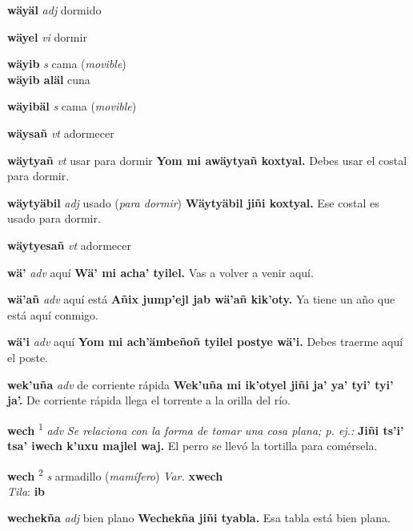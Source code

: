 \documentclass[10pt]{scrbook}
\newcommand{\entry}[1]{\textbf{#1}}
\newcommand{\defsuperscript}[1]{\textsuperscript{#1}}
\newcommand{\nontranslationdef}[1]{\textit{#1}}
\newcommand{\partofspeech}[1]{\textit{#1}}
\newcommand{\spanishtranslation}[1]{#1}
\newcommand{\clarification}[1]{(\textit{#1})}
\newcommand{\cholexample}[1]{\textbf{#1}}
\newcommand{\exampletranslation}[1]{#1}
\newcommand{\dialectvariant}[1]{\\\textit{#1}:}
\newcommand{\dialectword}[1]{\textbf{#1}}
\newcommand{\secondaryentry}[1]{\\\textbf{#1}}
\newcommand{\secondtranslation}[1]{#1}
\newcommand{\variation}[1]{\textit{Var.} \textbf{#1}}
\begin{document}
\begin{multicols}{2}
\entry{wäyäl}
\partofspeech{adj}
\spanishtranslation{dormido}

\entry{wäyel}
\partofspeech{vi}
\spanishtranslation{dormir}

\entry{wäyib}
\partofspeech{s}
\spanishtranslation{cama}
\clarification{movible}
\secondaryentry{wäyib aläl}
\secondtranslation{cuna}

\entry{wäyibäl}
\partofspeech{s}
\spanishtranslation{cama}
\clarification{movible}

\entry{wäysañ}
\partofspeech{vt}
\spanishtranslation{adormecer}

\entry{wäytyañ}
\partofspeech{vt}
\spanishtranslation{usar para dormir}
\cholexample{Yom mi awäytyañ koxtyal.}
\exampletranslation{Debes usar el costal para dormir.}

\entry{wäytyäbil}
\partofspeech{adj}
\spanishtranslation{usado}
\clarification{para dormir}
\cholexample{Wäytyäbil jiñi koxtyal.}
\exampletranslation{Ese costal es usado para dormir.}

\entry{wäytyesañ}
\partofspeech{vt}
\spanishtranslation{adormecer}

\entry{wä'}
\partofspeech{adv}
\spanishtranslation{aquí}
\cholexample{Wä' mi acha' tyilel.}
\exampletranslation{Vas a volver a venir aquí.}

\entry{wä'añ}
\partofspeech{adv}
\spanishtranslation{aquí está}
\cholexample{Añix jump'ejl jab wä'añ kik'oty.}
\exampletranslation{Ya tiene un año que está aquí conmigo.}

\entry{wä'i}
\partofspeech{adv}
\spanishtranslation{aquí}
\cholexample{Yom mi ach'ämbeñoñ tyilel postye wä'i.}
\exampletranslation{Debes traerme aquí el poste.}

\entry{wek'uña}
\partofspeech{adv}
\spanishtranslation{de corriente rápida}
\cholexample{Wek'uña mi ik'otyel jiñi ja' ya' tyi' tyi' ja'.}
\exampletranslation{De corriente rápida llega el torrente a la orilla del río.}

\entry{wech}
\defsuperscript{1}
\partofspeech{adv}
\nontranslationdef{Se relaciona con la forma de tomar una cosa plana; p. ej.:}
\cholexample{Jiñi ts'i' tsa' iwech k'uxu majlel waj.}
\exampletranslation{El perro se llevó la tortilla para comérsela.}

\entry{wech}
\defsuperscript{2}
\partofspeech{s}
\spanishtranslation{armadillo}
\clarification{mamífero}
\variation{xwech}
\dialectvariant{Tila}
\dialectword{ib}

\entry{wechekña}
\partofspeech{adj}
\spanishtranslation{bien plano}
\cholexample{Wechekña jiñi tyabla.}
\exampletranslation{Esa tabla está bien plana.}


\end{multicols}
\end{document}
